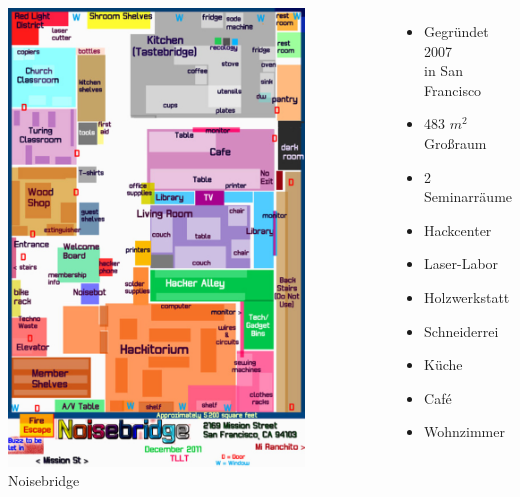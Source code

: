 \documentclass[aspectratio=43]{beamer}
\begin{document}
  \begin{frame}
    \begin{columns}[l]
      \includegraphics[width=0.8\textwidth]{noisebridge-map.jpg}
      Noisebridge
      \begin{itemize}
        \item Gegründet 2007\\in San Francisco
        \item 483 $m^2$ Großraum
        \item 2 Seminarräume
        \item Hackcenter
        \item Laser-Labor
        \item Holzwerkstatt
        \item Schneiderrei
        \item Küche
        \item Café
        \item Wohnzimmer
      \end{itemize}
    \end{columns}
  \end{frame}
\end{document}
